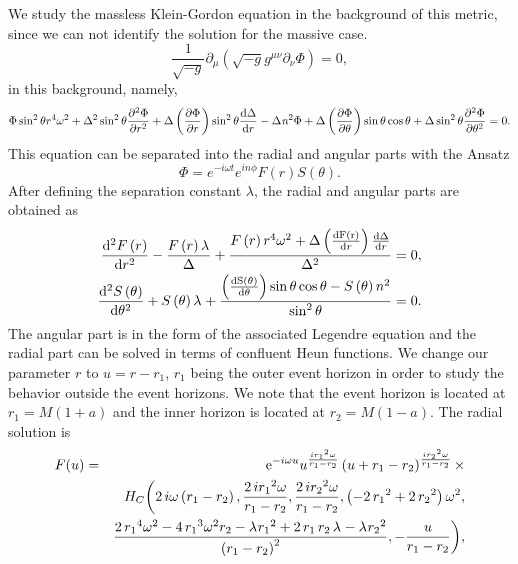 \documentclass{article}
\begin{document}
We study the massless Klein-Gordon equation in the background of
this  metric, since we can not identify the solution for
the massive case.
\begin{equation}
\frac{1}{\sqrt{-g}}\partial _{\mu }\left( \sqrt{-g}g^{\mu \nu }\partial_{\nu }\Phi \right)=0,
\end{equation}
in this background, namely,
\begin{eqnarray}
\Phi \sin^{2}\theta
  {r}^{4}{\omega}^{2}+ {\Delta} ^{2} \sin^{2}\theta{\frac {
\partial ^{2} \Phi}{\partial {r}^{2}}}  +{\Delta}  \left( {\frac {\partial \Phi}{\partial r}}
   \right)  \sin^{2}\theta{\frac {\rm d{\Delta}}{{\rm d}r}} -{\Delta}{{\it n}}^{
2}\Phi+{\Delta} \left( {\frac {\partial \Phi}{\partial
\theta}}  \right) \sin \theta
 \cos \theta  +{\Delta}
 \sin^{2} \theta {\frac {\partial ^{2} \Phi}
{\partial {\theta}^{2}}}=0.
\end{eqnarray}
This equation can be separated into the radial and angular parts
with the Ansatz
\begin{equation}
\Phi=e^{-i\omega t}e^{in\phi}F(r)S(\theta).
\end{equation}
After defining the separation constant $\lambda$, the
radial and angular parts are obtained as
\begin{eqnarray}
{\frac {{\rm d}^{2}{F\left( r \right)}}{{\rm d}{r}^{2}}}  -{
\frac {{F} \left( r \right) { \lambda}_{{}}}{{\Delta}
 }}+{\frac {{F} \left( r \right) {r}^{4}{\omega}^{2
}+{\Delta} \left( {\frac {\rm d{F(r)}}{{\rm d}r}}  \right) {\frac {\rm d{\Delta}}{{\rm d}r}}
 }{{\Delta} ^{2}}}=0, \\
{\frac {{\rm d}^{2} {S} \left( \theta
 \right)}{{\rm d}{\theta}^{2}}} +{S} \left( \theta \right) {\lambda}_{{}}+{\frac {
 \left( {\frac {\rm d {S} \left( \theta
  \right)}{{\rm d}\theta}}  \right) \sin \theta \cos \theta -{S} \left( \theta \right) {{n}}^{2}}{
\sin^{2} \theta }}=0.
\end{eqnarray}
The angular part is in the form of the associated Legendre equation and the radial part can be solved in terms of confluent Heun functions. We change our parameter $r$ to
$u=r-r_1$, $r_1$ being the  outer event horizon in order to study the behavior outside the event horizons. We note that the event horizon is located at $r_1=M(1+a)$ and the inner horizon is located at $r_2=M(1-a)$. The radial solution is
\begin{eqnarray}
F(u)&=&{{\rm e}^{-i\omega u}}{u}^{{\frac {i{{r_1}}^{2} \omega}{{r_1}-{r_2}}}} \left( u
+{r_1}-{r_2} \right) ^{{\frac {i{{r_2}}^{2} \omega}{{r_1}-{r_2}}}} \times   \\
&&{H_C} \bigg( 2\,i \omega \left( {r_1}-{r_2}
 \right) ,{\frac {2\,i{{r_1}}^{2} \omega}{{r_1}-{r_2}}},{\frac {2
\,i{{r_2}}^{2} \omega}{{r_1}-{r_2}}}, \left( -2\,{{r_1}}^{2}+2
\,{{r_2}}^{2} \right) {\omega}^{2}, \nonumber \\
&&{\frac {2\,{{r_1}}^{4}{\omega}^{2}-4\,{
{r_1}}^{3}{\omega}^{2}{r_2}-{\lambda}_{}{{r_1}}^{2}+2\,{r_1}
\,{r_2}\,{\lambda}_{}-{\lambda}_{}{{r_2}}^{2}}{ \left( {r_1}-{
r_2} \right) ^{2}}},-{\frac {u}{{r_1}-{r_2}}}
 \bigg), \nonumber
\end{eqnarray}
\end{document}
